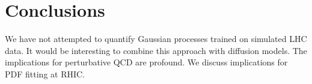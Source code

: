 \section{Conclusions}\label{sec:conclusions}

We have not attempted to quantify Gaussian processes trained on
simulated LHC data. It would be interesting to combine this approach
with diffusion models. The implications for perturbative QCD are
profound. We discuss implications for PDF fitting at RHIC.

